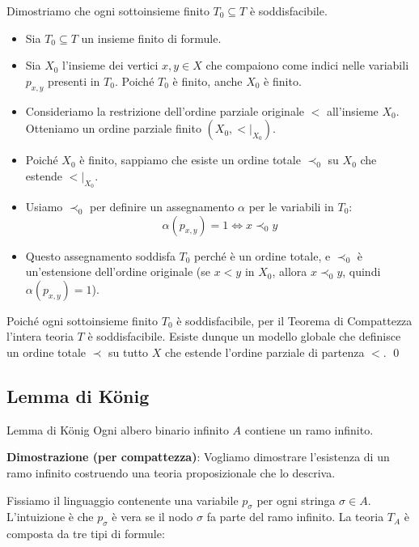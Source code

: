 \documentclass[a4paper,11pt]{report}
\begin{document}
Dimostriamo che ogni sottoinsieme finito \( T_0 \subseteq T \) è soddisfacibile.
\begin{itemize}
    \item Sia \( T_0 \subseteq T \) un insieme finito di formule.
    \item Sia \( X_0 \) l'insieme dei vertici \( x,y \in X \) che compaiono come indici nelle variabili \( p_{x,y} \) presenti in \( T_0 \). Poiché \( T_0 \) è finito, anche \( X_0 \) è finito.
    \item Consideriamo la restrizione dell'ordine parziale originale \( < \) all'insieme \( X_0 \). Otteniamo un ordine parziale finito \( (X_0, <|_{X_0}) \).
    \item Poiché \( X_0 \) è finito, sappiamo che esiste un ordine totale \( \prec_0 \) su \( X_0 \) che estende \( <|_{X_0} \).
    \item Usiamo \( \prec_0 \) per definire un assegnamento \( \alpha \) per le variabili in \( T_0 \):
    \[ \alpha(p_{x,y}) = 1 \iff x \prec_0 y \]
    \item Questo assegnamento soddisfa \( T_0 \) perché è un ordine totale, e \( \prec_0 \) è un'estensione dell'ordine originale (se \( x < y \) in \( X_0 \), allora \( x \prec_0 y \), quindi \( \alpha(p_{x,y})=1 \)).
\end{itemize}

Poiché ogni sottoinsieme finito \( T_0 \) è soddisfacibile, per il Teorema di Compattezza l'intera teoria \( T \) è soddisfacibile.
Esiste dunque un modello globale che definisce un ordine totale \( \prec \) su tutto \( X \) che estende l'ordine parziale di partenza \( < \). \qed

\subsection{Lemma di König}

\begin{thmframe}{Lemma di König}{}
Ogni albero binario infinito \( A \) contiene un ramo infinito.
\end{thmframe}

\textbf{Dimostrazione (per compattezza)}:
Vogliamo dimostrare l'esistenza di un ramo infinito costruendo una teoria proposizionale che lo descriva.

Fissiamo il linguaggio contenente una variabile \( p_\sigma \) per ogni stringa \( \sigma \in A \). L'intuizione è che \( p_\sigma \) è vera se il nodo \( \sigma \) fa parte del ramo infinito.
La teoria \( T_A \) è composta da tre tipi di formule:
\end{document}
